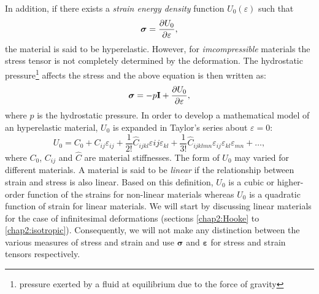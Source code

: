 \ON In addition, \OFF if there exists a \emph{strain energy density} function $U_0(\varepsilon)$ such that 
\begin{equation}
\label{chap2:energy}
\boldsymbol \sigma = \dfrac{\partial U_0}{\partial \varepsilon},
\end{equation}
\ON the material is said to be hyperelastic. \OFF However, for \emph{imcompressible} materials the stress tensor is not completely determined by the deformation. The hydrostatic pressure\footnote{pressure exerted by a fluid at equilibrium due to the force of gravity} affects the stress and the above equation is then written as:
\begin{equation}
\label{chap2:energy2}
\boldsymbol \sigma = -p \mathbf{I} + \dfrac{\partial U_0}{\partial \varepsilon},
\end{equation}
where $p$ is the hydrostatic pressure. In order to develop a mathematical model of an hyperelastic material, $U_0$ is expanded in Taylor's series about $\varepsilon = 0$:
\begin{equation}
U_0 = C_0 + C_{ij}\varepsilon_{ij} + \frac{1}{2!}\hat{C}_{ijkl}\varepsilon{ij}\varepsilon_{kl} + \frac{1}{3!}\hat{C}_{ijklmn}\varepsilon_{ij}\varepsilon_{kl}\varepsilon_{mn} + \ldots , 
\end{equation}
where $C_0$, $C_{ij}$ and $\hat{C}$ are material stiffnesses. The form of $U_0$ may varied for different materials. A material is said to be \emph{linear} if the relationship between strain and stress is also linear. Based on this definition, $U_0$ is a cubic or higher-order function of the strains for non-linear materials whereas $U_0$ is a quadratic function of strain for linear materials. We will start by discussing linear materials for the case of infinitesimal deformations (sections \ref{chap2:Hooke} to \ref{chap2:isotropic}). Consequently, we will not make any distinction between the various measures of stress and strain and use $\boldsymbol \sigma$ and $\boldsymbol \varepsilon$ for stress and strain tensors respectively. 
	
